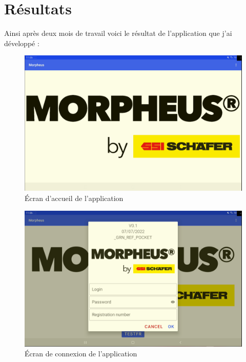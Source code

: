 \documentclass[a4paper, 12pt, french]{article}
\begin{document}
	\newpage

	\section{Résultats}
		Ainsi après deux mois de travail voici le résultat de l'application que j'ai développé :\\

			\begin{figure}[h!]
				\begin{center}
					\includegraphics[width=0.7\linewidth]{application/main.PNG}
				\end{center}
				\caption{Écran d'accueil de l'application}
				\label{fig:applications:main}
			\end{figure}	

\vfill

			\begin{figure}[h!]
				\begin{center}
					\includegraphics[width=0.7\linewidth]{application/login.PNG}
				\end{center}
				\caption{Écran de connexion de l'application}
				\label{fig:applications:login}
			\end{figure}	

\newpage
\end{document}
